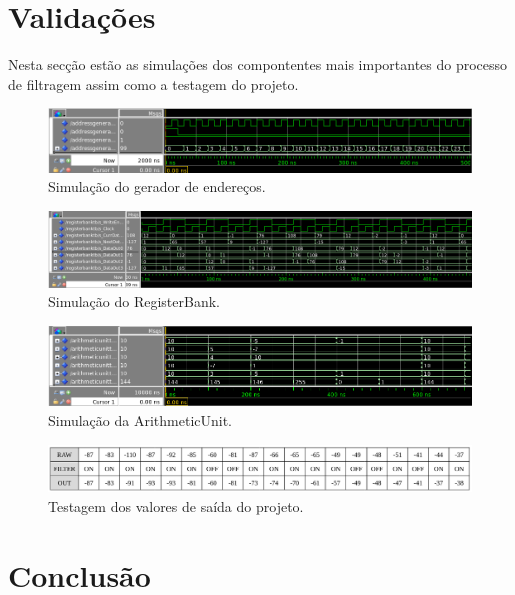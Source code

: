 \documentclass{report}
\begin{document}
\section*{Validações}
\label{chap.validacoes}

Nesta secção estão as simulações dos compontentes mais importantes do processo de filtragem assim como a testagem do projeto.

\begin{figure}[H]
    \centering
    \includegraphics[width=\textwidth]{addressgeneratorval.png}
    \caption{Simulação do gerador de endereços.}
\end{figure}

\begin{figure}[H]
    \centering
    \includegraphics[width=\textwidth]{registerbankval.png}
    \caption{Simulação do RegisterBank.}
\end{figure}

\begin{figure}[H]
    \centering
    \includegraphics[width=\textwidth]{arithmeticunitval.png}
    \caption{Simulação da ArithmeticUnit.}
\end{figure}

\begin{figure}[H]
    \centering
    \includegraphics[width=\textwidth]{values.png}
    \caption{Testagem dos valores de saída do projeto.}
\end{figure}

\section*{Conclusão}
\label{chap.conclusao}
\end{document}
